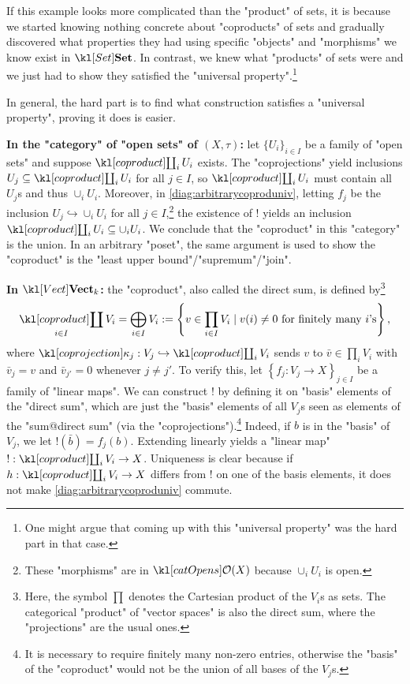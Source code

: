 \documentclass[main.tex]{subfiles}
\begin{document}
\begin{rem}
    If this example looks more complicated than the "product" of sets, it is because we started knowing nothing concrete about "coproducts" of sets and gradually discovered what properties they had using specific "objects" and "morphisms" we know exist in $\catSet$. In contrast, we knew what "products" of sets were and we just had to show they satisfied the "universal property".\footnote{One might argue that coming up with this "universal property" was the hard part in that case.}

    In general, the hard part is to find what construction satisfies a "universal property", proving it does is easier.
\end{rem}
\begin{exmps}
    \textbf{In the "category" of "open sets" of $(X, \tau)$:} let $\{U_i\}_{i \in I}$ be a family of "open sets" and suppose $\Coproduct_i U_i$ exists. The "coprojections" yield inclusions $U_j \subseteq \Coproduct_i U_i$ for all $j \in I$, so $\Coproduct_i U_i$ must contain all $U_j$s and thus $\cup_i U_i$. Moreover, in \eqref{diag:arbitrarycoproduniv}, letting $f_j$ be the inclusion $U_j \hookrightarrow \cup_iU_i$ for all $j\in I$,\footnote{These "morphisms" are in $\catOpens(X)$ because $\cup_i U_i$ is open.} the existence of $!$ yields an inclusion $\Coproduct_i U_i \subseteq \cup_i U_i$. We conclude that the "coproduct" in this "category" is the union. In an arbitrary "poset", the same argument is used to show the "coproduct" is the "least upper bound"/"supremum"/"join".

    \textbf{In $\catVect{k}$:} the "coproduct", also called the direct sum, is defined by\footnote{Here, the symbol $\prod$ denotes the Cartesian product of the $V_i$s as sets. The categorical "product" of "vector spaces" is also the direct sum, where the "projections" are the usual ones.} 
    \[\Coproduct_{i \in I} V_i = \bigoplus_{i \in I} V_i := \left\{ v \in \prod_{i\in I}V_i \mid v(i) \neq 0 \text{ for finitely many $i$'s} \right\},\]
    where $\coprojection_j: V_j \hookrightarrow \Coproduct_i V_i$ sends $v$ to $\bar{v} \in \prod_i V_i$ with $\bar{v}_j = v$ and $\bar{v}_{j'} = 0$ whenever $j \neq j'$. To verify this, let $\left\{ f_j: V_j \rightarrow X\right\}_{j \in I}$ be a family of "linear maps". We can construct $!$ by defining it on "basis" elements of the "direct sum", which are just the "basis" elements of all $V_j$s seen as elements of the "sum@direct sum" (via the "coprojections").\footnote{It is necessary to require finitely many non-zero entries, otherwise the "basis" of the "coproduct" would not be the union of all bases of the $V_j$s.} Indeed, if $b$ is in the "basis" of $V_j$, we let $!(\bar{b}) = f_j(b)$. Extending linearly yields a "linear map" $!: \Coproduct_iV_i \rightarrow X$. Uniqueness is clear because if $h:\Coproduct_iV_i \rightarrow X$ differs from $!$ on one of the basis elements, it does not make \eqref{diag:arbitrarycoproduniv} commute.
\end{exmps}
\end{document}
